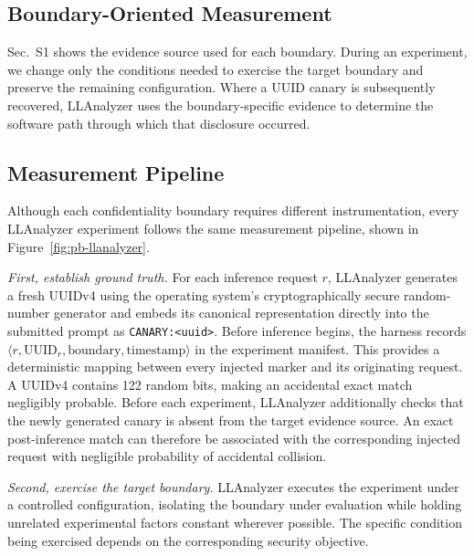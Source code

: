 \documentclass[journal,tifs]{IEEEtran}
\begin{document}
\subsection{Boundary-Oriented Measurement}
Sec.~S1 shows the
evidence source used for each boundary. During an experiment, we change
only the conditions needed to exercise the target boundary and preserve
the remaining configuration. Where a UUID canary is subsequently recovered,
LLAnalyzer uses the boundary-specific evidence to determine the software
path through which that disclosure occurred.
\subsection{Measurement Pipeline}

Although each confidentiality boundary requires different
instrumentation, every LLAnalyzer experiment follows the same measurement
pipeline, shown in Figure~\ref{fig:pb-llanalyzer}.

\textit{First, establish ground truth.}
For each inference request $r$, LLAnalyzer generates a fresh UUIDv4 using
the operating system's cryptographically secure random-number generator
and embeds its canonical representation directly into the submitted
prompt as \texttt{CANARY:<uuid>}. Before inference begins, the harness
records
$\langle
r,\mathrm{UUID}_r,\mathrm{boundary},\mathrm{timestamp}
\rangle$
%
in the experiment manifest. This provides a deterministic mapping between
every injected marker and its originating request. A UUIDv4 contains 122 random bits, making an accidental exact match
negligibly probable. Before each experiment, LLAnalyzer additionally
checks that the newly generated canary is absent from the target evidence
source. An exact post-inference match can therefore be associated with
the corresponding injected request with negligible probability of
accidental collision.

\textit{Second, exercise the target boundary.}
LLAnalyzer executes the experiment under a controlled configuration,
isolating the boundary under evaluation while holding unrelated
experimental factors constant wherever possible. The specific condition
being exercised depends on the corresponding security objective.
\end{document}
